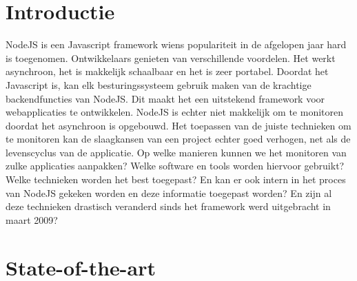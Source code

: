 
\section{Introductie} %
\label{sec:introductie}

NodeJS is een Javascript framework wiens populariteit in de afgelopen jaar hard is toegenomen. Ontwikkelaars genieten van verschillende voordelen. Het werkt asynchroon, het is makkelijk schaalbaar en het is zeer portabel. Doordat het Javascript is, kan elk besturingssysteem gebruik maken van de krachtige backendfuncties van NodeJS. Dit maakt het een uitstekend framework voor webapplicaties te ontwikkelen.  NodeJS is echter niet makkelijk om te monitoren doordat het asynchroon is opgebouwd. Het toepassen van de juiste technieken om te monitoren kan de slaagkansen van een project echter goed verhogen, net als de levenscyclus van de applicatie. Op welke manieren kunnen we het monitoren van zulke applicaties aanpakken? Welke software en tools worden hiervoor gebruikt? Welke technieken worden het best toegepast? En kan er ook intern in het proces van NodeJS gekeken worden en deze informatie toegepast worden? En zijn al deze technieken drastisch veranderd sinds het framework werd uitgebracht in maart 2009? 


\section{State-of-the-art}
\label{sec:state-of-the-art}

